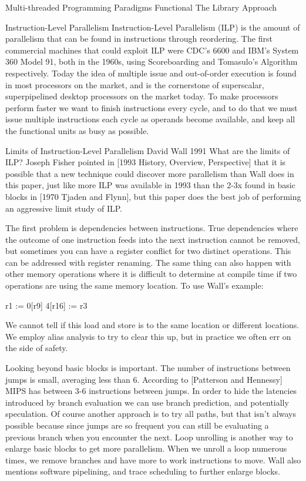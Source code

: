 Multi-threaded Programming Paradigms
Functional
The Library Approach

Instruction-Level Parallelism
Instruction-Level Parallelism (ILP) is the amount of parallelism that can be found in instructions through reordering. The first commercial machines that could exploit ILP were CDC’s 6600 and IBM’s System 360 Model 91, both in the 1960s, using Scoreboarding and Tomasulo’s Algorithm respectively. Today the idea of multiple issue and out-of-order execution is found in most processors on the market, and is the cornerstone of superscalar, superpipelined desktop processors on the market today. To make processors perform faster we want to finish instructions every cycle, and to do that we must issue multiple instructions each cycle as operands become available, and keep all the functional units as busy as possible.

Limits of Instruction-Level Parallelism
David Wall
1991
What are the limits of ILP? Joseph Fisher pointed in [1993 History, Overview, Perspective] that it is possible that a new technique could discover more parallelism than Wall does in this paper, just like more ILP was available in 1993 than the 2-3x found in basic blocks in [1970 Tjaden and Flynn], but this paper does the best job of performing an aggressive limit study of ILP.

The first problem is dependencies between instructions. True dependencies where the outcome of one instruction feeds into the next instruction cannot be removed, but sometimes you can have a register conflict for two distinct operations. This can be addressed with register renaming. The same thing can also happen with other memory operations where it is difficult to determine at compile time if two operations are using the same memory location. To use Wall’s example:

r1 := 0[r9]
4[r16] := r3

We cannot tell if this load and store is to the same location or different locations. We employ alias analysis to try to clear this up, but in practice we often err on the side of safety.

Looking beyond basic blocks is important. The number of instructions between jumps is small, averaging less than 6. According to [Patterson and Hennessy] MIPS has between 3-6 instructions between jumps. In order to hide the latencies introduced by branch evaluation we can use branch prediction, and potentially speculation. Of course another approach is to try all paths, but that isn’t always possible because since jumps are so frequent you can still be evaluating a previous branch when you encounter the next. Loop unrolling is another way to enlarge basic blocks to get more parallelism. When we unroll a loop numerous times, we remove branches and have more to work instructions to move. Wall also mentions software pipelining, and trace scheduling to further enlarge blocks.

